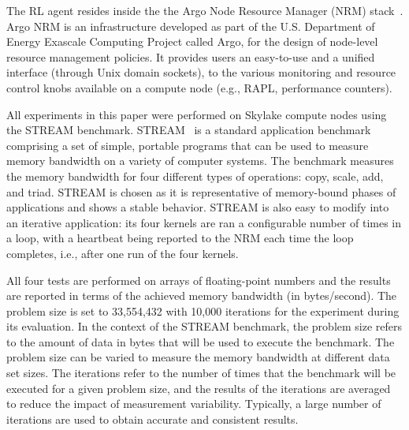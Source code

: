 The RL agent resides inside the the Argo Node Resource Manager (NRM) stack~\cite{anrm}.
Argo NRM is an infrastructure developed as part of the U.S. Department of Energy Exascale Computing Project called Argo, for the design of node-level resource management policies. It provides users an easy-to-use and a unified interface (through Unix domain sockets), to the various monitoring and resource control knobs available on a compute node (e.g., RAPL, performance counters). 

All experiments in this paper were performed on Skylake compute nodes using the STREAM benchmark.  
STREAM~\cite{mccalpin1997survey} is a standard application benchmark comprising a set of simple, portable programs that can be used to measure memory bandwidth on a variety of computer systems. The benchmark measures the memory bandwidth for four different types of operations: copy, scale, add, and triad. STREAM is chosen as it is representative of memory-bound phases of applications and shows a stable behavior. STREAM is also easy to modify into an iterative application: its four kernels are ran a configurable number of times in a loop, with a heartbeat being reported to the NRM each time the loop completes, i.e., after one run of the four kernels. 

All four tests are performed on arrays of floating-point numbers and the results are reported in terms of the achieved memory bandwidth (in bytes/second).  The problem size is set to 33,554,432 with 10,000 iterations for the experiment during its evaluation.
In the context of the STREAM benchmark, the problem size refers to the amount of data in bytes that will be used to execute the benchmark. The problem size can be varied to measure the memory bandwidth at different data set sizes. The iterations refer to the number of times that the benchmark will be executed for a given problem size, and the results of the iterations are averaged to reduce the impact of measurement variability. Typically, a large number of iterations are used to obtain accurate and consistent results. 

